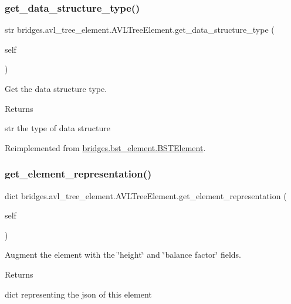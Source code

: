 \subsubsection{\texorpdfstring{get\_data\_structure\_type()}{get\_data\_structure\_type()}}
{\footnotesize\ttfamily  str bridges.\+avl\+\_\+tree\+\_\+element.\+A\+V\+L\+Tree\+Element.\+get\+\_\+data\+\_\+structure\+\_\+type (\begin{DoxyParamCaption}\item[{}]{self }\end{DoxyParamCaption})}



Get the data structure type. 

\begin{DoxyReturn}{Returns}


str the type of data structure 
\end{DoxyReturn}


Reimplemented from \mbox{\hyperlink{classbridges_1_1bst__element_1_1_b_s_t_element_a8e655e06ba0f77b7e2681b6d291f39de}{bridges.\+bst\+\_\+element.\+B\+S\+T\+Element}}.

\mbox{\label{classbridges_1_1avl__tree__element_1_1_a_v_l_tree_element_abf8842cb462f1e31f0889d67fb0d70d4}} 
\subsubsection{\texorpdfstring{get\_element\_representation()}{get\_element\_representation()}}
{\footnotesize\ttfamily  dict bridges.\+avl\+\_\+tree\+\_\+element.\+A\+V\+L\+Tree\+Element.\+get\+\_\+element\+\_\+representation (\begin{DoxyParamCaption}\item[{}]{self }\end{DoxyParamCaption})}



Augment the element with the \char`\"{}height\char`\"{} and \char`\"{}balance factor\char`\"{} fields. 

\begin{DoxyReturn}{Returns}


dict representing the json of this element 
\end{DoxyReturn}


